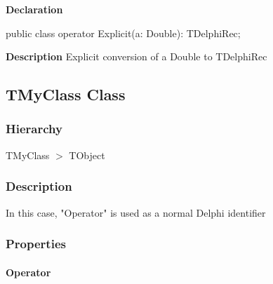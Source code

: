 \documentclass{report}
\begin{document}
\begin{list}{}{
\setlength{\itemindent}{0cm}
\setlength{\listparindent}{0cm}
\setlength{\leftmargin}{\evensidemargin}
\addtolength{\leftmargin}{\tmplength}
\settowidth{\labelsep}{X}
\addtolength{\leftmargin}{\labelsep}
\setlength{\labelwidth}{\tmplength}
}
\begin{flushleft}
\item[\textbf{Declaration}\hfill]
\begin{ttfamily}
public class operator Explicit(a: Double): TDelphiRec;\end{ttfamily}


\end{flushleft}
\par
\item[\textbf{Description}]
Explicit conversion of a Double to TDelphiRec

\end{list}
\subsection*{TMyClass Class}
\subsubsection*{\large{\textbf{Hierarchy}}\normalsize\hspace{1ex}\hfill}
TMyClass {$>$} TObject
\subsubsection*{\large{\textbf{Description}}\normalsize\hspace{1ex}\hfill}
In this case, "Operator" is used as a normal Delphi identifier\subsubsection*{\large{\textbf{Properties}}\normalsize\hspace{1ex}\hfill}
\paragraph*{Operator}\hspace*{\fill}
\end{document}
